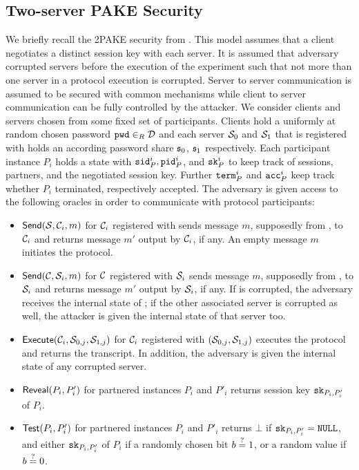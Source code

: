 \subsection{Two-server PAKE Security} \label{sec:2pake-model}
We briefly recall the \ac{2PAKE} security from \citet{Katz2012a}.
This model assumes that a client negotiates a distinct session key with each server.
It is assumed that adversary \cA corrupted servers before the execution of the experiment such that not more than one server in a protocol execution is corrupted.
Server to server communication is assumed to be secured with common mechanisms while client to server communication can be fully controlled by the attacker.
We consider clients \Client and servers \Server chosen from some fixed set of participants.
Clients hold a uniformly at random chosen password $\mathtt{pwd}\in_R\mathcal{D}$ and each server $\mathcal{S}_0$ and $\mathcal{S}_1$ that \Client is registered with holds an according password share $\mathfrak{s}_0$, $\mathfrak{s}_1$ respectively.
Each participant instance $P_i$ holds a state with $\mathtt{sid}_P^i, \mathtt{pid}_P^i$, and $\mathtt{sk}_P^i$ to keep track of sessions, partners, and the negotiated session key.
Further $\mathtt{term}_P^i$ and $\mathtt{acc}_P^i$ keep track whether $P_i$ terminated, respectively accepted.
The adversary is given access to the following oracles in order to communicate with protocol participants:

\begin{itemize}
  \item $\mathsf{Send}(\mathcal{S}, \mathcal{C}_i, m)$ for $\mathcal{C}_i$ registered with \Server sends message $m$, supposedly from \Server, to $\mathcal{C}_i$ and returns message $m'$ output by $\mathcal{C}_i$, if any.
    An empty message $m$ initiates the protocol.
  
  \item $\mathsf{Send}(\mathcal{C}, \mathcal{S}_i, m)$ for $\mathcal{C}$ registered with $\mathcal{S}_i$ sends message $m$, supposedly from \Client, to $\mathcal{S}_i$ and returns message $m'$ output by $\mathcal{S}_i$, if any.
    If \Server is corrupted, the adversary receives the internal state of \Server; if the other associated server is corrupted as well, the attacker is given the internal state of that server too.
    
  \item $\mathsf{Execute}(\mathcal{C}_i, \mathcal{S}_{0,j}, \mathcal{S}_{1,j})$ for $\mathcal{C}_i$ registered with $(\mathcal{S}_{0,j},\mathcal{S}_{1,j})$ executes the protocol and returns the transcript.
    In addition, the adversary is given the internal state of any corrupted server.
  
  \item $\mathsf{Reveal}(P_i, P'_i)$ for partnered instances $P_i$ and $P'_i$ returns session key $\mathtt{sk}_{P_i,P'_i}$ of $P_i$.
  
  \item $\mathsf{Test}(P_i, P'_i)$ for partnered instances $P_i$ and $P'_i$ returns $\bot$ if $\mathtt{sk}_{P_i, P'_i}=\mathtt{NULL}$, and either $\mathtt{sk}_{P_i,P'_i}$ of $P_i$ if a randomly chosen bit $b\stackrel{?}{=} 1$, or a random value if $b\stackrel{?}{=} 0$.
    
\end{itemize}

